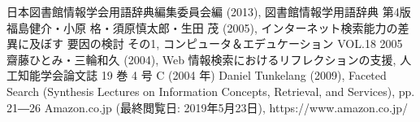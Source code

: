\documentclass[a4j,10pt, twocolumn]{jarticle} \usepackage[dvipdfmx]{graphicx} \usepackage{amssymb} \usepackage{amsmath}
\begin{document}
\begin{thebibliography}{9}
  日本図書館情報学会用語辞典編集委員会編 (2013), 図書館情報学用語辞典 第4版
   福島健介・小原 格・須原慎太郎・生田 茂 (2005), インターネット検索能力の差異に及ぼす 要因の検討 その1, コンピュータ＆エデュケーション VOL.18 2005
   齋藤ひとみ・三輪和久 (2004),  Web 情報検索におけるリフレクションの支援, 人工知能学会論文誌 19 巻 4 号 C (2004 年)
  Daniel Tunkelang (2009), Faceted Search (Synthesis Lectures on Information Concepts, Retrieval, and Services), pp. 21―26
  Amazon.co.jp (最終閲覧日: 2019年5月23日), https://www.amazon.co.jp/
\end{thebibliography}
\end{document}
